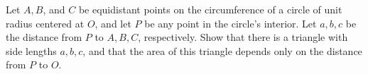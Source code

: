Let  $A,B$, and $C$  be equidistant points on the circumference of a circle
of unit radius centered at  $O$,  and let  $P$  be any point in the circle's
interior.  Let  $a, b, c$  be the distance from  $P$  to $A, B, C$,
respectively.
Show that there is a triangle with side lengths  $a, b, c$,  and that the
area of this triangle depends only on the distance from  $P$  to  $O$.
